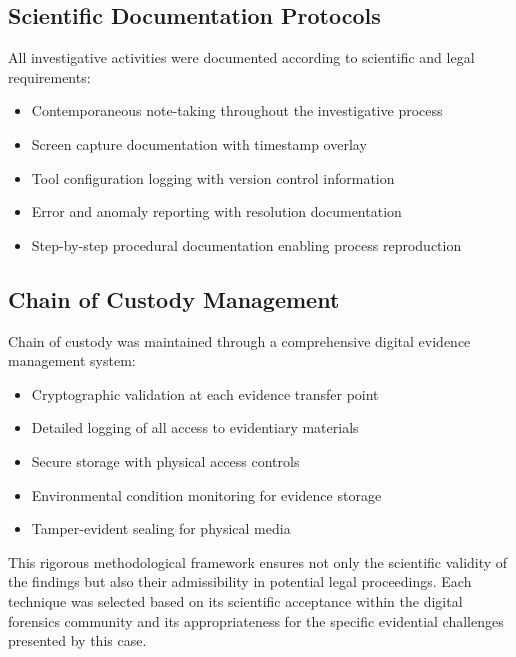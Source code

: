 \subsection{Scientific Documentation Protocols}
All investigative activities were documented according to scientific and legal requirements:
\begin{itemize}
    \item Contemporaneous note-taking throughout the investigative process
    \item Screen capture documentation with timestamp overlay
    \item Tool configuration logging with version control information
    \item Error and anomaly reporting with resolution documentation
    \item Step-by-step procedural documentation enabling process reproduction
\end{itemize}

\subsection{Chain of Custody Management}
Chain of custody was maintained through a comprehensive digital evidence management system:
\begin{itemize}
    \item Cryptographic validation at each evidence transfer point
    \item Detailed logging of all access to evidentiary materials
    \item Secure storage with physical access controls
    \item Environmental condition monitoring for evidence storage
    \item Tamper-evident sealing for physical media
\end{itemize}

This rigorous methodological framework ensures not only the scientific validity of the findings but also their admissibility in potential legal proceedings. Each technique was selected based on its scientific acceptance within the digital forensics community and its appropriateness for the specific evidential challenges presented by this case.